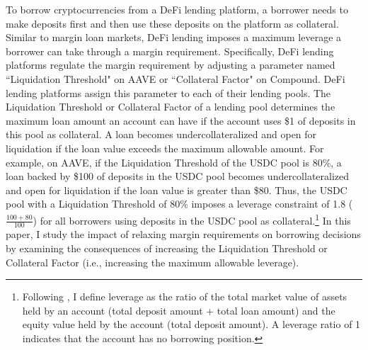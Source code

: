 \documentclass[12pt]{article}
\begin{document}
To borrow cryptocurrencies from a DeFi lending platform, a borrower needs to make deposits first and then use these deposits on the platform as collateral. Similar to margin loan markets, DeFi lending imposes a maximum leverage a borrower can take through a margin requirement. Specifically, DeFi lending platforms regulate the margin requirement by adjusting a parameter named ``Liquidation Threshold" on AAVE or ``Collateral Factor" on Compound. DeFi lending platforms assign this parameter to each of their lending pools. The Liquidation Threshold or Collateral Factor of a lending pool determines the maximum loan amount an account can have if the account uses \$1 of deposits in this pool as collateral. A loan becomes undercollateralized and open for liquidation if the loan value exceeds the maximum allowable amount. For example, on AAVE, if the Liquidation Threshold of the USDC pool is 80\%, a loan backed by \$100 of deposits in the USDC pool becomes undercollateralized and open for liquidation if the loan value is greater than \$80. Thus, the USDC pool with a Liquidation Threshold of 80\% imposes a leverage constraint of 1.8 ($\frac{100+80}{100}$) for all borrowers using deposits in the USDC pool as collateral.\footnote{Following \cite{bian2021margin}, I define leverage as the ratio of the total market value of assets held by an account (total deposit amount + total loan amount) and the equity value held by the account (total deposit amount). A leverage ratio of 1 indicates that the account has no borrowing position.} In this paper, I study the impact of relaxing margin requirements on borrowing decisions by examining the consequences of increasing the Liquidation Threshold or Collateral Factor (i.e., increasing the maximum allowable leverage).
\end{document}
